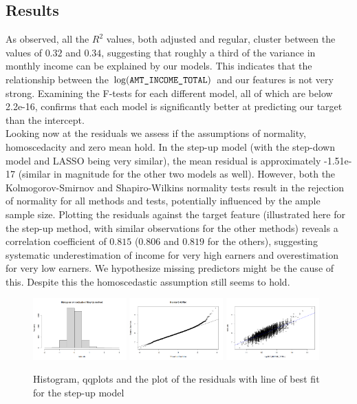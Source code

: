 \documentclass[hidelinks,12pt]{article}
\begin{document}
\subsection{Results}
As observed, all the $R^2$ values, both adjusted and regular, cluster between the values of $0.32$ and $0.34$, suggesting that roughly a third of the variance in monthly income can be explained by our models. This indicates that the relationship between the $\log(\verb|AMT_INCOME_TOTAL|)$ and our features is not very strong. Examining the F-tests for each different model, all of which are below 2.2e-16, confirms that each model is significantly better at predicting our target than the intercept.\\ 
Looking now at the residuals we assess if the assumptions of normality, homoscedacity and zero mean hold. In the step-up model (with the step-down model and LASSO being very similar), the mean residual is approximately -1.51e-17 (similar in magnitude for the other two models as well). However, both the Kolmogorov-Smirnov and Shapiro-Wilkins normality tests result in the rejection of normality for all methods and tests, potentially influenced by the ample sample size. Plotting the residuals against the target feature (illustrated here for the step-up method, with similar observations for the other methods) reveals a correlation coefficient of $0.815$ ($0.806$ and $0.819$ for the others), suggesting systematic underestimation of income for very high earners and overestimation for very low earners. We hypothesize missing predictors might be the cause of this. Despite this the homoscedastic assumption still seems to hold. 
\begin{figure}[h]
  \begin{center}
  \includegraphics[width=0.32\textwidth]{img/20da428d-0af1-4f49-a7aa-66b7a1fe13bc.png}
  \includegraphics[width=0.32\textwidth]{img/6f01eecb-4039-4daa-ba0c-af7263bd658c.png}
  \includegraphics[width=0.32\textwidth]{img/b94b8a81-3824-47f5-a158-d8e9560e6ce2.png}
\end{center}
\caption{Histogram, qqplots and the plot of the residuals with line of best fit for the step-up model}
\end{figure}\\
\end{document}
